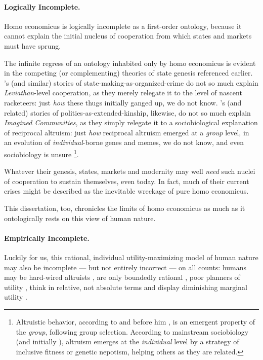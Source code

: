{\paragraph{Logically Incomplete.} 
Homo economicus is logically incomplete as a first-order ontology, because it cannot explain the initial nucleus of cooperation from which states and markets must have sprung.

The infinite regress of an ontology inhabited only by homo economicus is evident in the competing (or complementing) theories of state genesis referenced earlier.
\citeauthor{Tilly-1985-aa}'s (and similar) stories of state-making-as-organized-crime do not so much explain \emph{Leviathan}-level cooperation, as they merely relegate it to the level of nascent racketeers: just \emph{how} these thugs initially ganged up, we do not know.
\citeauthor{Van-den-Berghe-1981-aa}'s (and related) stories of polities-as-extended-kinship, likewise, do not so much explain \emph{Imagined Communities}, as they simply relegate it to a sociobiological explanation of reciprocal altruism: just \emph{how} reciprocal altruism emerged at a \emph{group} level, in an evolution of \emph{individual}-borne genes and memes, we do not know, and even sociobiology is unsure
\footnote{
	Altruistic behavior, according to \cite{Wilson2012} and before him \cite{Darwin1859}, is an emergent property of the \emph{group}, following group selection. 
	According to mainstream sociobiology (and initially \citealt{Wilson1975}), altruism emerges at the \emph{individual} level by a strategy of inclusive fitness or genetic nepotism, helping others as they are related.
}.

Whatever their genesis, states, markets and modernity may well \emph{need} such nuclei of cooperation to sustain themselves, even today. 
In fact, much of their current crises might be described as the inevitable wreckage of pure homo economicus. 

This dissertation, too, chronicles the limits of homo economicus as much as it ontologically rests on this view of human nature.

\paragraph{Empirically Incomplete.} 
Luckily for us, this rational, individual utility-maximizing model of human nature may also be incomplete --- but not entirely incorrect --- on all counts: humans may be hard-wired altruists \citep[for example,][]{Zak2004}, are only boundedly rational \citep{Simon-1999-aa,Kahneman2011}, poor planners of utility \citep[summarized in][]{Gilbert2006}, think in relative, not absolute terms \citep{Frank2005} and display diminishing marginal utility \citep{Ng-1997-aa,Veenhoven-2000-aa,Nickell2008}. %

}
